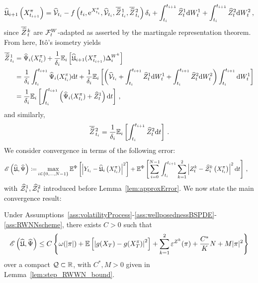 \begin{equation}\label{eq:martingaleRep}
    \widehat{\mathfrak{U}}_{i+1}\left(X^\pi_{t_{i+1}}\right)=\widehat{\mathcal{V}}_{t_{i}}-f\left(t_{i},\mathrm{e}^{X^\pi_{t_{i}}}, \widehat{\mathcal{V}}_{t_{i}}, \overline{\widehat{Z}}\kern0.1em^{1}_{t_{i}}, \overline{\widehat{Z}}\kern0.1em^{2}_{t_{i}}\right) \delta_{i} +\int_{t_{i}}^{t_{i+1}}{\widehat{Z}}_{t}^1\mathrm{d} W^1_{t}+\int_{t_{i}}^{t_{i+1}} {\widehat{Z}}_{t}^2 \mathrm{d} W^2_{t}\,,
\end{equation}
since $\overline{\widehat{Z}}\kern0.1em^{k}_{t}$ are $\mathcal{F}_t^W$-adapted as asserted by the martingale representation theorem. From here, It\^o's isometry yields
\begin{align*}
    \overline{\widehat{Z}}\kern0.1em^{1}_{t_{i}} &= \widehat\Psi_i(X^\pi_{t_i}) +  \frac1{\delta_{i}}\mathbb{E}_i\left[\widehat{\mathfrak{U}}_{i+1}(X^\pi_{t_{i+1}})\Delta^{W^k}_{i} \right] \\
    &= \frac1{\delta_{i}}\int_{t_i}^{t_{i+1}}\widehat\Psi_i(X^\pi_{t_i})\mathrm{d} t +  \frac1{\delta_{i}}\mathbb{E}_i\left[\left(\widehat{\mathcal{V}}_{t_i} +\int_{t_{i}}^{t_{i+1}} \widehat{Z}_{t}^1 \mathrm{d} W^1_{t}+\int_{t_{i}}^{t_{i+1}} \widehat{Z}_{t}^2 \mathrm{d} W^2_{t} \right)\int_{t_i}^{t_{i+1}} \mathrm{d} W^1_t \right]  \\
    &= \frac1{\delta_{i}}\mathbb{E}_i\left[\int_{t_i}^{t_{i+1}}\left( \widehat\Psi_i(X^\pi_{t_i}) + \widehat{Z}_{t}^1 \right)\mathrm{d} t \right]\,,
\end{align*}
and similarly, 
$$
\overline{\widehat{Z}}\kern0.1em^{2}_{t_{i}} = \frac1{\delta_{i}}\mathbb{E}_i\left[\int_{t_i}^{t_{i+1}} \widehat{Z}_{t}^2 \mathrm{d} t \right]\,.
$$
We consider convergence in terms of the following error:
\[
\begin{aligned}
\mathscr{E}\left(\widehat{\mathfrak{U}}, \widehat\Psi\right) \coloneqq &\max _{i\in\{0, \dots, N-1\}} \mathbb{E}^\Phi\left[\left|Y_{t_i}-\widehat{\mathfrak{U}}_i\left(X^\pi_{t_i}\right)\right|^2\right]+\mathbb{E}^\Phi\left[\sum_{i=0}^{N-1} \int_{t_i}^{t_{i+1}}\sum_{k=1}^2\left|Z_t^k-\widehat{\mathcal{Z}}^k_i\left(X^\pi_{t_i}\right)\right|^2 \mathrm{d} t\right]\,,
\end{aligned}
\]
with $\widehat{\mathcal{Z}}^1_{i}, \widehat{\mathcal{Z}}^2_{i}$
introduced before Lemma~\ref{lem:approxError}. 
We now state the main convergence result:
\begin{theorem}\label{thm:convergence}
Under Assumptions~\ref{ass:volatilityProcess}-\ref{ass:wellposednessBSPDE}-\ref{ass:RWNNscheme},
there exists $C>0$ such that
\[
\mathscr{E}\left(\widehat{\mathfrak{U}}, \widehat\Psi\right) \leq C\left\{\omega(|\pi|) + \mathbb{E}\left[\left|g(X_T)-g(X^{\pi}_{T})\right|^2\right]+\sum_{k=1}^2\varepsilon^{Z^k}(\pi)+\frac{C^{*}}{K}N+ M|\pi|^2\right\}  
\]
over a compact $\mathcal{Q}\subset \mathbb{R}$, with $C^*, M>0$ given in Lemma~\ref{lem:step_RWWN_bound}.
\end{theorem}


